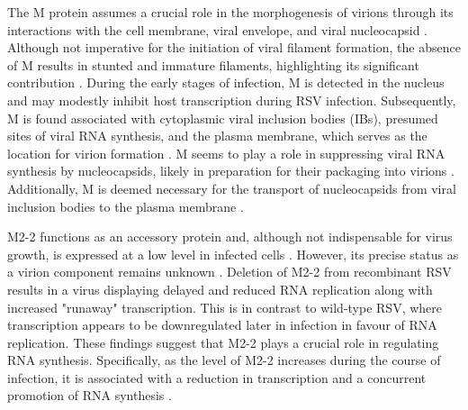 The M protein assumes a crucial role in the morphogenesis of virions through its interactions with the cell membrane, viral envelope, and viral nucleocapsid \cite{Li2008AssociationProtein, Marty2003AssociationCells}. Although not imperative for the initiation of viral filament formation, the absence of M results in stunted and immature filaments, highlighting its significant contribution \cite{Mitra2012TheFilaments}. During the early stages of infection, M is detected in the nucleus and may modestly inhibit host transcription during RSV infection. Subsequently, M is found associated with cytoplasmic viral inclusion bodies (IBs), presumed sites of viral RNA synthesis, and the plasma membrane, which serves as the location for virion formation \cite{Ghildyal2006CentralInfection}. M seems to play a role in suppressing viral RNA synthesis by nucleocapsids, likely in preparation for their packaging into virions \cite{Ghildyal2006CentralInfection, NarayanTalukdar2022RespiratoryVirus}. Additionally, M is deemed necessary for the transport of nucleocapsids from viral inclusion bodies to the plasma membrane \cite{Mitra2012TheFilaments, Collins2013RespiratoryDisease}.

M2-2 functions as an accessory protein and, although not indispensable for virus growth, is expressed at a low level in infected cells \cite{Cheng2005OverexpressionReplication, Melero2006MolecularVirus}. However, its precise status as a virion component remains unknown \cite{Collins2013RespiratoryDisease}. Deletion of M2-2 from recombinant RSV results in a virus displaying delayed and reduced RNA replication along with increased "runaway" transcription. This is in contrast to wild-type RSV, where transcription appears to be downregulated later in infection in favour of RNA replication. These findings suggest that M2-2 plays a crucial role in regulating RNA synthesis. Specifically, as the level of M2-2 increases during the course of infection, it is associated with a reduction in transcription and a concurrent promotion of RNA synthesis \cite{Teng1998IdentificationParticles}.

